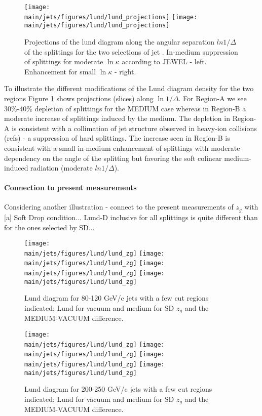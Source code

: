 \begin{figure}[htbp]
	\centering
	\texttt{[image: \\main/jets/figures/lund/lund\_projections]}
	\texttt{[image: \\main/jets/figures/lund/lund\_projections]}
	\caption{Projections of the lund diagram along the angular separation $ln 1/\Delta$ of the splittings for the two selections of jet \pt. In-medium suppression of splittings for moderate $\ln{\kappa}$ according to JEWEL - left. Enhancement for small $\ln{\kappa}$ - right.}
	\label{fig:Lund_projections}
\end{figure}

To illustrate the different modifications of the Lund diagram density for the two regions Figure \ref{fig:Lund_projections} shows projections (slices) along $\ln 1/\Delta$. For Region-A we see 30\%-40\% depletion of splittings for the MEDIUM case whereas in Region-B a moderate increase of splittings induced by the medium. The depletion in Region-A is consistent with a collimation of jet structure observed in heavy-ion collisions (refs) - a suppression of hard splittings. The increase seen in Region-B is consistent with a small in-medium enhancement of splittings with moderate dependency on the angle of the splitting but favoring the soft colinear medium-induced radiation (moderate $ln 1/\Delta$).

\paragraph{Connection to present measurements}

Considering another illustration - connect to the present measurements of $z_{g}$ with [a] Soft Drop condition... Lund-D inclusive for all splittings is quite different than for the ones selected by SD...

\begin{figure}[htbp]
	\centering
	\texttt{[image: \\main/jets/figures/lund/lund\_zg]}
	\texttt{[image: \\main/jets/figures/lund/lund\_zg]}
	\texttt{[image: \\main/jets/figures/lund/lund\_zg]}
	\texttt{[image: \\main/jets/figures/lund/lund\_zg]}
	\caption{Lund diagram for 80-120 GeV/c jets with a few cut regions indicated; Lund for vacuum and medium for SD $z_{g}$ and the MEDIUM-VACUUM difference.}
	\label{fig:Lund_zg_lowpt}
\end{figure}

\begin{figure}[htbp]
	\centering
	\texttt{[image: \\main/jets/figures/lund/lund\_zg]}
	\texttt{[image: \\main/jets/figures/lund/lund\_zg]}
	\texttt{[image: \\main/jets/figures/lund/lund\_zg]}
	\texttt{[image: \\main/jets/figures/lund/lund\_zg]}
	\caption{Lund diagram for 200-250 GeV/c jets with a few cut regions indicated; Lund for vacuum and medium for SD $z_{g}$ and the MEDIUM-VACUUM difference.}
	\label{fig:Lund_zg_highpt}
\end{figure}

